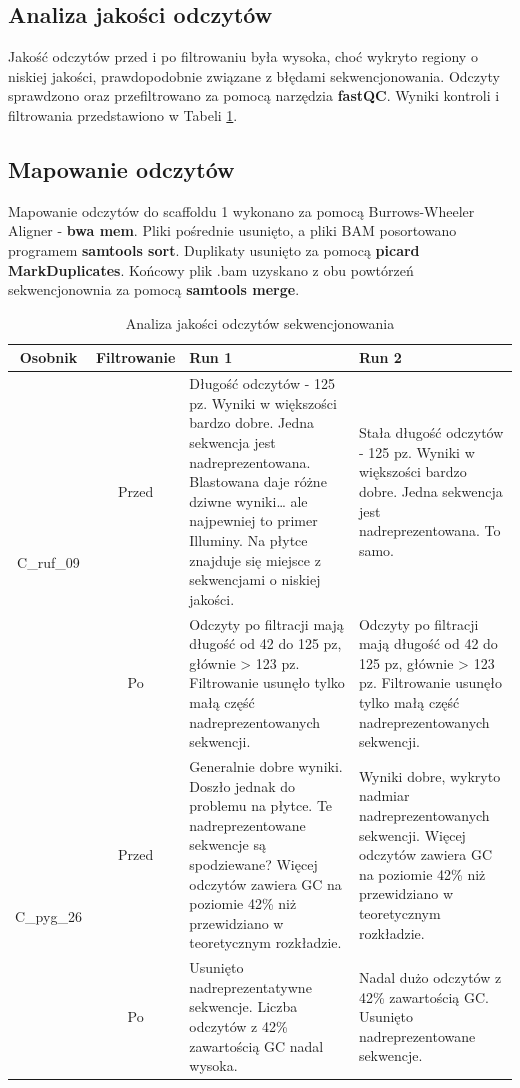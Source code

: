 \documentclass[a4paper, 12pt]{article}
\begin{document}
\subsection{Analiza jakości odczytów}
Jakość odczytów przed i po filtrowaniu była wysoka, choć wykryto regiony o niskiej jakości, prawdopodobnie związane z błędami sekwencjonowania. Odczyty sprawdzono oraz przefiltrowano za pomocą narzędzia \textbf{fastQC}. Wyniki kontroli i filtrowania przedstawiono w Tabeli \ref{tab:quality_analysis}. 
\subsection{Mapowanie odczytów}
 Mapowanie odczytów do scaffoldu 1 wykonano za pomocą Burrows-Wheeler Aligner - \textbf{bwa mem}. Pliki pośrednie usunięto, a pliki BAM posortowano programem \textbf{samtools sort}. Duplikaty usunięto za pomocą \textbf{picard MarkDuplicates}. Końcowy plik .bam uzyskano z obu powtórzeń sekwencjonownia za pomocą \textbf{samtools merge}.

\begin{table}[H]
    \centering
    \begin{tabular}{|c|c|p{5cm}|p{5cm}|}
        \hline
        Osobnik & Filtrowanie & Run 1 & Run 2 \\
        \hline
        \multirow{2}{*}{C\_ruf\_09} & Przed & 
        Długość odczytów - 125 pz. Wyniki w większości bardzo dobre. Jedna sekwencja jest nadreprezentowana. Blastowana daje różne dziwne wyniki… ale najpewniej to primer Illuminy. Na płytce znajduje się miejsce z sekwencjami o niskiej jakości. & 
        Stała długość odczytów - 125 pz. Wyniki w większości bardzo dobre. Jedna sekwencja jest nadreprezentowana. To samo. \\
        \cline{2-4}
        & Po & 
        Odczyty po filtracji mają długość od 42 do 125 pz, głównie > 123 pz. Filtrowanie usunęło tylko małą część nadreprezentowanych sekwencji. & 
        Odczyty po filtracji mają długość od 42 do 125 pz, głównie > 123 pz. Filtrowanie usunęło tylko małą część nadreprezentowanych sekwencji. \\
        \hline
        \multirow{2}{*}{C\_pyg\_26} & Przed & 
        Generalnie dobre wyniki. Doszło jednak do problemu na płytce. Te nadreprezentowane sekwencje są spodziewane? Więcej odczytów zawiera GC na poziomie 42\% niż przewidziano w teoretycznym rozkładzie. & 
        Wyniki dobre, wykryto nadmiar nadreprezentowanych sekwencji. Więcej odczytów zawiera GC na poziomie 42\% niż przewidziano w teoretycznym rozkładzie. \\
        \cline{2-4}
        & Po & 
        Usunięto nadreprezentatywne sekwencje. Liczba odczytów z 42\% zawartością GC nadal wysoka. & 
        Nadal dużo odczytów z 42\% zawartością GC. Usunięto nadreprezentowane sekwencje. \\
        \hline
    \end{tabular}
    \caption{Analiza jakości odczytów sekwencjonowania}
    \label{tab:quality_analysis}
\end{table}
\end{document}
